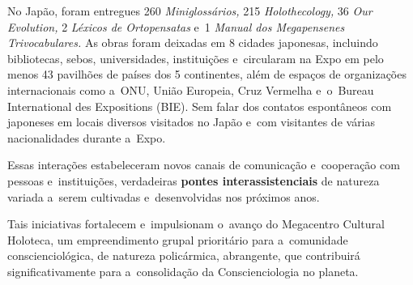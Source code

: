 \documentclass{gescons}
\begin{document}
No Japão, foram entregues 260 \emph{Miniglossários,} 215 \emph{Holothecology,} 36 \emph{Our Evolution,} 2 \emph{Léxicos de Ortopensatas} e~1 \emph{Manual dos Megapensenes Trivocabulares.} As obras foram deixadas em 8 cidades japonesas, incluindo bibliotecas, sebos, universidades, instituições e~circularam na Expo em pelo menos 43 pavilhões de países dos 5 continentes, além de espaços de organizações internacionais como a~ONU, União Europeia, Cruz Vermelha e~o~Bureau International des Expositions (BIE). Sem falar dos contatos espontâneos com japoneses em locais diversos visitados no Japão e~com visitantes de várias nacionalidades durante a~Expo.

Essas interações estabeleceram novos canais de comunicação e~cooperação com pessoas e~instituições, verdadeiras \textbf{pontes interassistenciais} de natureza variada a~serem cultivadas e~desenvolvidas nos próximos anos.

Tais iniciativas fortalecem e~impulsionam o~avanço do Megacentro Cultural Holoteca, um empreendimento grupal prioritário para a~comunidade conscienciológica, de natureza policármica, abrangente, que contribuirá significativamente para a~consolidação da Conscienciologia no planeta.


        
\end{document}

